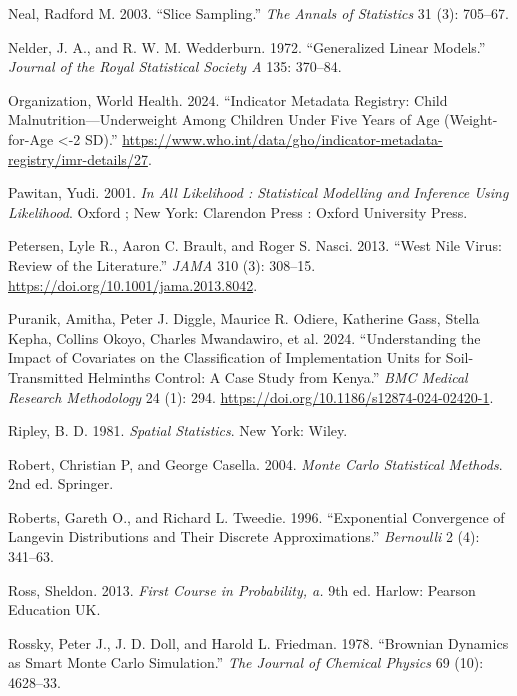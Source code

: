 \documentclass[
  letterpaper,
]{krantz}
\newlength{\cslhangindent}
\newenvironment{CSLReferences}[2] %
 {\begin{list}{}{%
  \setlength{\itemindent}{0pt}
  \setlength{\leftmargin}{0pt}
  \setlength{\parsep}{0pt}
  \ifodd #1
   \setlength{\leftmargin}{\cslhangindent}
   \setlength{\itemindent}{-1\cslhangindent}
  \fi
  \setlength{\itemsep}{#2\baselineskip}}}
 {\end{list}}
\begin{document}
\begin{CSLReferences}{1}{0}
Neal, Radford M. 2003. {``Slice Sampling.''} \emph{The Annals of
Statistics} 31 (3): 705--67.

Nelder, J. A., and R. W. M. Wedderburn. 1972. {``Generalized Linear
Models.''} \emph{Journal of the Royal Statistical Society A} 135:
370--84.

Organization, World Health. 2024. {``Indicator Metadata Registry: Child
Malnutrition---Underweight Among Children Under Five Years of Age
(Weight-for-Age \textless-2 SD).''}
\url{https://www.who.int/data/gho/indicator-metadata-registry/imr-details/27}.

Pawitan, Yudi. 2001. \emph{In All Likelihood : Statistical Modelling and
Inference Using Likelihood}. Oxford ; New York: Clarendon Press : Oxford
University Press.

Petersen, Lyle R., Aaron C. Brault, and Roger S. Nasci. 2013. {``West
Nile Virus: Review of the Literature.''} \emph{JAMA} 310 (3): 308--15.
\url{https://doi.org/10.1001/jama.2013.8042}.

Puranik, Amitha, Peter J. Diggle, Maurice R. Odiere, Katherine Gass,
Stella Kepha, Collins Okoyo, Charles Mwandawiro, et al. 2024.
{``Understanding the Impact of Covariates on the Classification of
Implementation Units for Soil-Transmitted Helminths Control: A Case
Study from Kenya.''} \emph{BMC Medical Research Methodology} 24 (1):
294. \url{https://doi.org/10.1186/s12874-024-02420-1}.

Ripley, B. D. 1981. \emph{Spatial Statistics}. New York: Wiley.

Robert, Christian P, and George Casella. 2004. \emph{Monte Carlo
Statistical Methods}. 2nd ed. Springer.

Roberts, Gareth O., and Richard L. Tweedie. 1996. {``Exponential
Convergence of Langevin Distributions and Their Discrete
Approximations.''} \emph{Bernoulli} 2 (4): 341--63.

Ross, Sheldon. 2013. \emph{First Course in Probability, a.} 9th ed.
Harlow: Pearson Education UK.

Rossky, Peter J., J. D. Doll, and Harold L. Friedman. 1978. {``Brownian
Dynamics as Smart Monte Carlo Simulation.''} \emph{The Journal of
Chemical Physics} 69 (10): 4628--33.


\end{CSLReferences}
\end{document}
